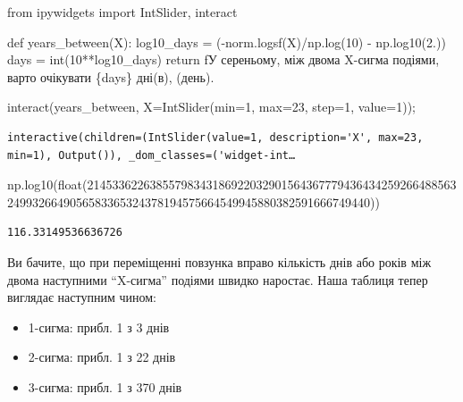 \documentclass[
  letterpaper,
]{report}
\newenvironment{Shaded}{\begin{snugshade}}{\end{snugshade}}
\newcommand{\BuiltInTok}[1]{\textcolor[rgb]{0.00,0.23,0.31}{#1}}
\newcommand{\ControlFlowTok}[1]{\textcolor[rgb]{0.00,0.23,0.31}{#1}}
\newcommand{\DecValTok}[1]{\textcolor[rgb]{0.68,0.00,0.00}{#1}}
\newcommand{\FloatTok}[1]{\textcolor[rgb]{0.68,0.00,0.00}{#1}}
\newcommand{\ImportTok}[1]{\textcolor[rgb]{0.00,0.46,0.62}{#1}}
\newcommand{\KeywordTok}[1]{\textcolor[rgb]{0.00,0.23,0.31}{#1}}
\newcommand{\NormalTok}[1]{\textcolor[rgb]{0.00,0.23,0.31}{#1}}
\newcommand{\OperatorTok}[1]{\textcolor[rgb]{0.37,0.37,0.37}{#1}}
\newcommand{\SpecialCharTok}[1]{\textcolor[rgb]{0.37,0.37,0.37}{#1}}
\newcommand{\SpecialStringTok}[1]{\textcolor[rgb]{0.13,0.47,0.30}{#1}}
\providecommand{\tightlist}{%
  \setlength{\itemsep}{0pt}\setlength{\parskip}{0pt}}\usepackage{longtable,booktabs,array}
\begin{document}
\begin{Shaded}
\begin{Highlighting}[]
\ImportTok{from}\NormalTok{ ipywidgets }\ImportTok{import}\NormalTok{ IntSlider, interact}

\KeywordTok{def}\NormalTok{ years\_between(X):}
\NormalTok{    log10\_days }\OperatorTok{=}\NormalTok{ (}\OperatorTok{{-}}\NormalTok{norm.logsf(X)}\OperatorTok{/}\NormalTok{np.log(}\DecValTok{10}\NormalTok{) }\OperatorTok{{-}}\NormalTok{ np.log10(}\FloatTok{2.}\NormalTok{))}
\NormalTok{    days }\OperatorTok{=} \BuiltInTok{int}\NormalTok{(}\DecValTok{10}\OperatorTok{**}\NormalTok{log10\_days)}
    \ControlFlowTok{return} \SpecialStringTok{f\textquotesingle{}У сереньому, між двома X{-}сигма подіями, варто очікувати }\SpecialCharTok{\{}\NormalTok{days}\SpecialCharTok{\}}\SpecialStringTok{ дні(в), (день).\textquotesingle{}}

\NormalTok{interact(years\_between, X}\OperatorTok{=}\NormalTok{IntSlider(}\BuiltInTok{min}\OperatorTok{=}\DecValTok{1}\NormalTok{, }\BuiltInTok{max}\OperatorTok{=}\DecValTok{23}\NormalTok{, step}\OperatorTok{=}\DecValTok{1}\NormalTok{, value}\OperatorTok{=}\DecValTok{1}\NormalTok{))}\OperatorTok{;}
\end{Highlighting}
\end{Shaded}

\begin{verbatim}
interactive(children=(IntSlider(value=1, description='X', max=23, min=1), Output()), _dom_classes=('widget-int…
\end{verbatim}

\begin{Shaded}
\begin{Highlighting}[]
\NormalTok{np.log10(}\BuiltInTok{float}\NormalTok{(}\DecValTok{214533622638557983431869220329015643677794364342592664885632499326649056583365324378194575664549945880382591666749440}\NormalTok{))}
\end{Highlighting}
\end{Shaded}

\begin{verbatim}
116.33149536636726
\end{verbatim}

Ви бачите, що при переміщенні повзунка вправо кількість днів або років
між двома наступними ``X-сигма'' подіями швидко наростає. Наша таблиця
тепер виглядає наступним чином:

\begin{itemize}
\tightlist
\item
  1-сигма: прибл. 1 з 3 днів
\item
  2-сигма: прибл. 1 з 22 днів
\item
  3-сигма: прибл. 1 з 370 днів
\end{itemize}
\end{document}
